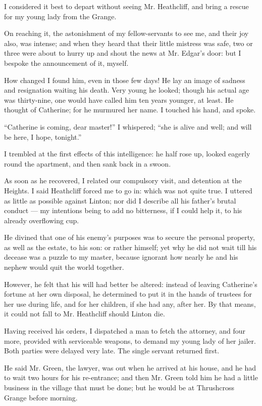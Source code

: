 \par I considered it best to depart without seeing Mr. Heathcliff, and bring a rescue for my young lady from the Grange.
\par On reaching it, the astonishment of my fellow-servants to see me, and their joy also, was intense; and when they heard that their little mistress was safe, two or three were about to hurry up and shout the news at Mr. Edgar's door: but I bespoke the announcement of it, myself.
\par How changed I found him, even in those few days! He lay an image of sadness and resignation waiting his death. Very young he looked; though his actual age was thirty-nine, one would have called him ten years younger, at least. He thought of Catherine; for he murmured her name. I touched his hand, and spoke.
\par “Catherine is coming, dear master!” I whispered; “she is alive and well; and will be here, I hope, tonight.”
\par I trembled at the first effects of this intelligence: he half rose up, looked eagerly round the apartment, and then sank back in a swoon.
\par As soon as he recovered, I related our compulsory visit, and detention at the Heights. I said Heathcliff forced me to go in: which was not quite true. I uttered as little as possible against Linton; nor did I describe all his father's brutal conduct — my intentions being to add no bitterness, if I could help it, to his already overflowing cup.
\par He divined that one of his enemy's purposes was to secure the personal property, as well as the estate, to his son: or rather himself; yet why he did not wait till his decease was a puzzle to my master, because ignorant how nearly he and his nephew would quit the world together.
\par However, he felt that his will had better be altered: instead of leaving Catherine's fortune at her own disposal, he determined to put it in the hands of trustees for her use during life, and for her children, if she had any, after her. By that means, it could not fall to Mr. Heathcliff should Linton die.
\par Having received his orders, I dispatched a man to fetch the attorney, and four more, provided with serviceable weapons, to demand my young lady of her jailer. Both parties were delayed very late. The single servant returned first.
\par He said Mr. Green, the lawyer, was out when he arrived at his house, and he had to wait two hours for his re-entrance; and then Mr. Green told him he had a little business in the village that must be done; but he would be at Thrushcross Grange before morning.
